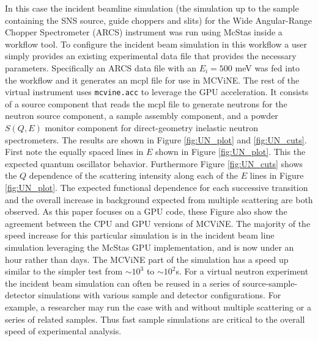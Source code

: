 In this case the incident beamline simulation (the simulation up to the sample containing the SNS source, guide choppers and slits) for the Wide Angular-Range Chopper Spectrometer (ARCS) instrument\cite{abernathy2012arcs, stone2014comparison} was run using McStas\cite{Willendrup:2020aa,Willendrup:2021aa} inside a workflow tool\cite{10.1007/978-3-031-23606-8_9}.
To configure the incident beam simulation in this workflow a user simply provides an existing experimental data file that provides the necessary parameters.
Specifically an ARCS data file with an $E_i = 500$ meV was fed into the workflow and it generates an mcpl\cite{KITTELMANN201717} file\cite{data_doi} for use in  MCViNE.
The rest of the virtual instrument uses \texttt{mcvine.acc} to leverage the GPU acceleration. It consists of a source component that reads the mcpl file to generate neutrons for the neutron source component,  a sample assembly component, and a powder $S(Q, E)$ monitor component for direct-geometry inelastic neutron spectrometers.
The results are shown in Figure \ref{fig:UN_plot} and \ref{fig:UN_cuts}.
First note the equally spaced lines in $E$ shown in Figure \ref{fig:UN_plot}. This the expected quantum oscillator behavior.  
Furthermore Figure \ref{fig:UN_cuts} shows the $Q$ dependence of the scattering intensity along each of the $E$ lines in Figure \ref{fig:UN_plot}. 
The expected functional dependence for each successive transition and the overall increase in background expected from multiple scattering are both observed.  
As this paper focuses on a GPU code, these Figure also show the agreement between the CPU and GPU versions of MCViNE. 
The majority of the speed increase for this particular simulation is in the incident beam line simulation leveraging the McStas GPU implementation, and is now under an hour rather than days.  
The MCViNE part of the simulation has a speed up similar to the simpler test from $\sim 10^3$ to $\sim 10^2$s.
For a virtual neutron experiment the incident beam simulation can often be reused in a series of source-sample-detector simulations with various sample and detector configurations.
For example, a researcher may run the case with and without multiple scattering or a series of related samples. Thus fast sample simulations are critical to the overall speed of experimental analysis.



